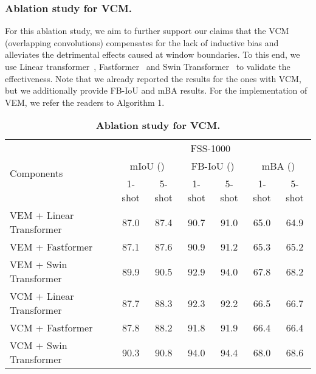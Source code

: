 \subsubsection{Ablation study for VCM.}
For this ablation study, we aim to further support our claims that the VCM (overlapping convolutions) compensates for the lack of inductive bias and alleviates the detrimental effects caused at window boundaries. To this end, we use Linear transformer~\cite{katharopoulos2020transformers}, Fastformer~\cite{wu2021fastformer} and Swin Transformer~\cite{liu2021swin} to validate the effectiveness. Note that we already reported the results for the ones with VCM, but we additionally provide FB-IoU and mBA results. For the implementation of VEM, we refer the readers to Algorithm 1. 




\begin{table}[]
    \centering
   \begin{tabular}{l|cc|cc|cc}
\toprule
     \multirow{3}{*}{Components} &\multicolumn{6}{c}{FSS-1000~\cite{li2020fss}} \\
     &\multicolumn{2}{c}{mIoU ()}&\multicolumn{2}{c}{FB-IoU ()}&\multicolumn{2}{c}{mBA ()}\\
 &1-shot &5-shot &1-shot &5-shot &1-shot &5-shot\\  \midrule
VEM + Linear Transformer~\cite{katharopoulos2020transformers}&87.0 &87.4&90.7&91.0&65.0&64.9\\
VEM + Fastformer~\cite{wu2021fastformer}&87.1&87.6&90.9&91.2&65.3&65.2\\
VEM + Swin Transformer~\cite{liu2021swin}&89.9&90.5&92.9&94.0&67.8&68.2\\\midrule
VCM + Linear Transformer~\cite{katharopoulos2020transformers}& 87.7&88.3&92.3&92.2&66.5&66.7\\
VCM + Fastformer~\cite{wu2021fastformer}& 87.8&88.2&91.8&91.9&66.4&66.4\\
VCM + Swin Transformer~\cite{liu2021swin}&90.3&90.8&94.0&94.4&68.0&68.6\\

\bottomrule
    \end{tabular}
        \caption{\textbf{Ablation study for VCM. }}\label{vcm}
\end{table}



